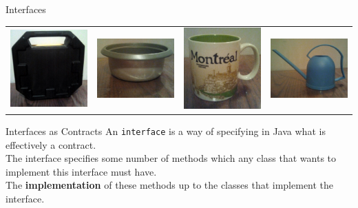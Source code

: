 \documentclass[aspectratio=169]{beamer}
\begin{document}
\begin{frame}{Interfaces}
\begin{center}
\begin{tabular}{l l l l}
\includegraphics[width=.22\textwidth]{img/box-scaled.jpg} &
\includegraphics[width=.22\textwidth]{img/bowl-scaled.jpg} &
\includegraphics[width=.22\textwidth]{img/mug-scaled} &
\includegraphics[width=.22\textwidth]{img/wateringcan-scaled.jpg} \\
\end{tabular}
\end{center}
\end{frame}



\begin{frame}{Interfaces as Contracts}
An \texttt{interface} is a way of specifying in Java what is effectively a contract. \\
\vspace{1em}
The interface specifies some number of methods which any class that wants to implement this interface must have. \\
\vspace{1em}
The \textbf{implementation} of these methods up to the classes that \alert{implement} the interface. 
\end{frame}
\end{document}
